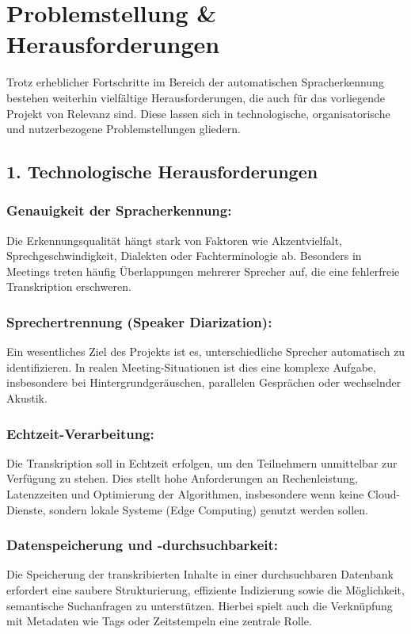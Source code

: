 \chapter{Problemstellung \& Herausforderungen}

Trotz erheblicher Fortschritte im Bereich der automatischen Spracherkennung bestehen weiterhin vielfältige Herausforderungen, die auch für das vorliegende Projekt von Relevanz sind. Diese lassen sich in technologische, organisatorische und nutzerbezogene Problemstellungen gliedern.

\section{1. Technologische Herausforderungen}

\subsection{Genauigkeit der Spracherkennung:}
Die Erkennungsqualität hängt stark von Faktoren wie Akzentvielfalt, Sprechgeschwindigkeit, Dialekten oder Fachterminologie ab. Besonders in Meetings treten häufig Überlappungen mehrerer Sprecher auf, die eine fehlerfreie Transkription erschweren.

\subsection{Sprechertrennung (Speaker Diarization):}
Ein wesentliches Ziel des Projekts ist es, unterschiedliche Sprecher automatisch zu identifizieren. In realen Meeting-Situationen ist dies eine komplexe Aufgabe, insbesondere bei Hintergrundgeräuschen, parallelen Gesprächen oder wechselnder Akustik.

\subsection{Echtzeit-Verarbeitung:}
Die Transkription soll in Echtzeit erfolgen, um den Teilnehmern unmittelbar zur Verfügung zu stehen. Dies stellt hohe Anforderungen an Rechenleistung, Latenzzeiten und Optimierung der Algorithmen, insbesondere wenn keine Cloud-Dienste, sondern lokale Systeme (Edge Computing) genutzt werden sollen.

\subsection{Datenspeicherung und -durchsuchbarkeit:}
Die Speicherung der transkribierten Inhalte in einer durchsuchbaren Datenbank erfordert eine saubere Strukturierung, effiziente Indizierung sowie die Möglichkeit, semantische Suchanfragen zu unterstützen. Hierbei spielt auch die Verknüpfung mit Metadaten wie Tags oder Zeitstempeln eine zentrale Rolle.

